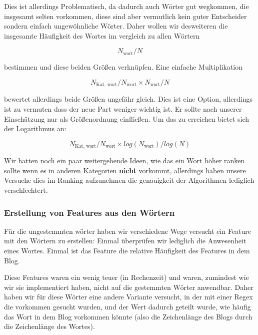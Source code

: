 \documentclass[
	11pt,
	a4paper
]{scrartcl}
\begin{document}
Dies ist allerdings Problematisch, da dadurch auch Wörter gut wegkommen, die insgesamt selten vorkommen, diese sind aber vermutlich kein guter Entscheider sondern einfach ungewöhnliche Wörter.
Daher wollen wir desweiteren die insgesamte Häufigkeit des Wortes im vergleich zu allen Wörtern

\begin{equation}
	N_{\text{wort}} / N
\end{equation} 

bestimmen und diese beiden Größen verknüpfen.
Eine einfache Multiplikation 

\begin{equation}
	N_{\text{Kat, wort}} / N_{\text{wort}} \times N_{\text{wort}} / N
\end{equation}

bewertet allerdings beide Größen ungefähr gleich. 
Dies ist eine Option, allerdings ist zu vermuten dass der neue Part weniger wichtig ist. 
Er sollte nach unserer Einschätzung nur als Größenordnung einfließen. 
Um das zu erreichen bietet sich der Logarithmus an:

\begin{equation} \label{eq-log}
	N_{\text{Kat, wort}} / N_{\text{wort}} \times log(N_{\text{wort}}) / log(N)
\end{equation}

Wir hatten noch ein paar weitergehende Ideen, wie das ein Wort höher ranken sollte wenn es in anderen Kategorien \textbf{nicht} vorkommt, 
allerdings haben unsere Versuche dies im Ranking aufzunehmen die genauigkeit der Algorithmen lediglich verschlechtert.

\subsubsection{Erstellung von Features aus den Wörtern}

Für die ungestemmten wörter haben wir verschiedene Wege versucht ein Feature mit den Wörtern zu erstellen:
Einmal überprüfen wir lediglich die Anwesenheit eines Wortes.
Einmal ist das Feature die relative Häufigkeit des Features in dem Blog.

Diese Features waren ein wenig teuer (in Rechenzeit) und waren, zumindest wie wir sie implementiert haben, nicht auf die gestemmten Wörter anwendbar.
Daher haben wir für diese Wörter eine andere Variante versucht, in der mit einer Regex die vorkommen gesucht wurden, 
und der Wert dadurch geteilt wurde, wie häufig das Wort in dem Blog vorkommen könnte (also die Zeichenlänge des Blogs durch die Zeichenlänge des Wortes).
\end{document}
